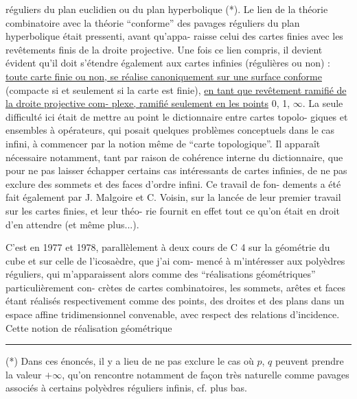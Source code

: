 \documentclass[11pt]{article}
\newcommand{\scanpage}[1]{\par\bigskip\noindent{\small\sffamily[scan #1]}\par}
\newcommand{\mspage}[1]{{\small\sffamily[p.\,#1]}}
\newcommand{\uline}[1]{\underline{#1}}
\begin{document}
\clearpage
\scanpage{119/97}
\mspage{19}

réguliers du plan euclidien ou du plan hyperbolique (*). Le lien
de la théorie combinatoire avec la théorie ``conforme'' des pavages
réguliers du plan hyperbolique était pressenti, avant qu'appa-%
raisse celui des cartes finies avec les revêtements finis de la
droite projective. Une fois ce lien compris, il devient évident
qu'il doit s'étendre également aux cartes infinies (régulières
ou non) : \uline{toute carte finie ou non, se réalise canoniquement sur
une surface conforme} (compacte si et seulement si la carte est
finie), \uline{en tant que revêtement ramifié de la droite projective com-%
plexe, ramifié seulement en les points} 0, 1, $\infty$. La seule difficulté
ici était de mettre au point le dictionnaire entre cartes topolo-%
giques et ensembles à opérateurs, qui posait quelques problèmes
conceptuels dans le cas infini, à commencer par la notion même de
``carte topologique''. Il apparaît nécessaire notamment, tant par
raison de cohérence interne du dictionnaire, que pour ne pas laisser
échapper certains cas intéressants de cartes infinies, de ne pas
exclure des sommets et des faces d'ordre infini. Ce travail de fon-%
dements a été fait également par J. Malgoire et C. Voisin, sur la
lancée de leur premier travail sur les cartes finies, et leur théo-%
rie fournit en effet tout ce qu'on était en droit d'en attendre
(et même plus...).

C'est en 1977 et 1978, parallèlement à deux cours de C 4
sur la géométrie du cube et sur celle de l'icosaèdre, que j'ai com-%
mencé à m'intéresser aux polyèdres réguliers, qui m'apparaissent
alors comme des ``réalisations géométriques'' particulièrement con-%
crètes de cartes combinatoires, les sommets, arêtes et faces étant
réalisés respectivement comme des points, des droites et des plans
dans un espace affine tridimensionnel convenable, avec respect des
relations d'incidence. Cette notion de réalisation géométrique

\rule{4cm}{0.4pt}

(*) Dans ces énoncés, il y a lieu de ne pas exclure le cas où $p$, $q$
peuvent prendre la valeur $+\infty$, qu'on rencontre notamment de façon
très naturelle comme pavages associés à certains polyèdres réguliers
infinis, cf. plus bas.
\end{document}
